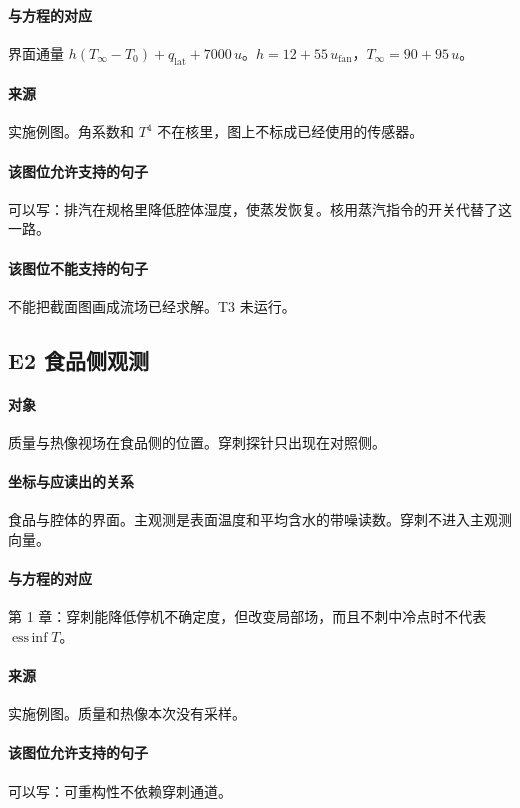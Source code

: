 \paragraph{与方程的对应}
界面通量 $h(T_\infty-T_0)+q_{\mathrm{lat}}+7000\,u$。$h=12+55\,u_{\mathrm{fan}}$，$T_\infty=90+95\,u$。

\paragraph{来源}
实施例图。角系数和 $T^4$ 不在核里，图上不标成已经使用的传感器。

\paragraph{该图位允许支持的句子}
可以写：排汽在规格里降低腔体湿度，使蒸发恢复。核用蒸汽指令的开关代替了这一路。

\paragraph{该图位不能支持的句子}
不能把截面图画成流场已经求解。T3 未运行。

\subsection{E2 食品侧观测}
\paragraph{对象}
质量与热像视场在食品侧的位置。穿刺探针只出现在对照侧。

\paragraph{坐标与应读出的关系}
食品与腔体的界面。主观测是表面温度和平均含水的带噪读数。穿刺不进入主观测向量。

\paragraph{与方程的对应}
第 1 章：穿刺能降低停机不确定度，但改变局部场，而且不刺中冷点时不代表 $\operatorname{ess\,inf} T$。

\paragraph{来源}
实施例图。质量和热像本次没有采样。

\paragraph{该图位允许支持的句子}
可以写：可重构性不依赖穿刺通道。

